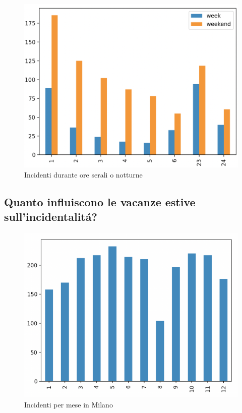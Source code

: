 \documentclass[a4paper]{report}
\begin{document}
\begin{figure}[!ht]
    \includegraphics[width=\linewidth]{../src/incidenti/incidenti_senza_coords/ore_punta/ore_notte.png}
    \caption{Incidenti durante ore serali o notturne}
    \label{fig:ore_notte}
\end{figure}


\newpage
\subsection{Quanto influiscono le vacanze estive sull'incidentalit\'a?}

\begin{figure}[!ht]
    \includegraphics[width=\linewidth]{../src/incidenti/incidenti_senza_coords/mese_incidenti/milano_mese.png}
    \caption{Incidenti per mese in Milano}
    \label{fig:milano_mese}
\end{figure}
\end{document}

